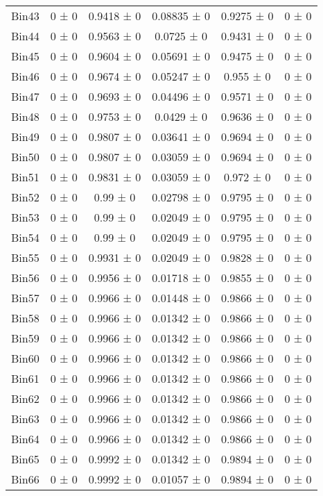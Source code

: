 \begin{tabular}{@{\extracolsep{4pt}}lccccc@{}}
     Bin43 & 0 ± 0 & 0.9418 ± 0 & 0.08835 ± 0 & 0.9275 ± 0 & 0 ± 0 \\ 
     Bin44 & 0 ± 0 & 0.9563 ± 0 & 0.0725 ± 0 & 0.9431 ± 0 & 0 ± 0 \\ 
     Bin45 & 0 ± 0 & 0.9604 ± 0 & 0.05691 ± 0 & 0.9475 ± 0 & 0 ± 0 \\ 
     Bin46 & 0 ± 0 & 0.9674 ± 0 & 0.05247 ± 0 & 0.955 ± 0 & 0 ± 0 \\ 
     Bin47 & 0 ± 0 & 0.9693 ± 0 & 0.04496 ± 0 & 0.9571 ± 0 & 0 ± 0 \\ 
     Bin48 & 0 ± 0 & 0.9753 ± 0 & 0.0429 ± 0 & 0.9636 ± 0 & 0 ± 0 \\ 
     Bin49 & 0 ± 0 & 0.9807 ± 0 & 0.03641 ± 0 & 0.9694 ± 0 & 0 ± 0 \\ 
     Bin50 & 0 ± 0 & 0.9807 ± 0 & 0.03059 ± 0 & 0.9694 ± 0 & 0 ± 0 \\ 
     Bin51 & 0 ± 0 & 0.9831 ± 0 & 0.03059 ± 0 & 0.972 ± 0 & 0 ± 0 \\ 
     Bin52 & 0 ± 0 & 0.99 ± 0 & 0.02798 ± 0 & 0.9795 ± 0 & 0 ± 0 \\ 
     Bin53 & 0 ± 0 & 0.99 ± 0 & 0.02049 ± 0 & 0.9795 ± 0 & 0 ± 0 \\ 
     Bin54 & 0 ± 0 & 0.99 ± 0 & 0.02049 ± 0 & 0.9795 ± 0 & 0 ± 0 \\ 
     Bin55 & 0 ± 0 & 0.9931 ± 0 & 0.02049 ± 0 & 0.9828 ± 0 & 0 ± 0 \\ 
     Bin56 & 0 ± 0 & 0.9956 ± 0 & 0.01718 ± 0 & 0.9855 ± 0 & 0 ± 0 \\ 
     Bin57 & 0 ± 0 & 0.9966 ± 0 & 0.01448 ± 0 & 0.9866 ± 0 & 0 ± 0 \\ 
     Bin58 & 0 ± 0 & 0.9966 ± 0 & 0.01342 ± 0 & 0.9866 ± 0 & 0 ± 0 \\ 
     Bin59 & 0 ± 0 & 0.9966 ± 0 & 0.01342 ± 0 & 0.9866 ± 0 & 0 ± 0 \\ 
     Bin60 & 0 ± 0 & 0.9966 ± 0 & 0.01342 ± 0 & 0.9866 ± 0 & 0 ± 0 \\ 
     Bin61 & 0 ± 0 & 0.9966 ± 0 & 0.01342 ± 0 & 0.9866 ± 0 & 0 ± 0 \\ 
     Bin62 & 0 ± 0 & 0.9966 ± 0 & 0.01342 ± 0 & 0.9866 ± 0 & 0 ± 0 \\ 
     Bin63 & 0 ± 0 & 0.9966 ± 0 & 0.01342 ± 0 & 0.9866 ± 0 & 0 ± 0 \\ 
     Bin64 & 0 ± 0 & 0.9966 ± 0 & 0.01342 ± 0 & 0.9866 ± 0 & 0 ± 0 \\ 
     Bin65 & 0 ± 0 & 0.9992 ± 0 & 0.01342 ± 0 & 0.9894 ± 0 & 0 ± 0 \\ 
     Bin66 & 0 ± 0 & 0.9992 ± 0 & 0.01057 ± 0 & 0.9894 ± 0 & 0 ± 0 \\ 

\end{tabular}
